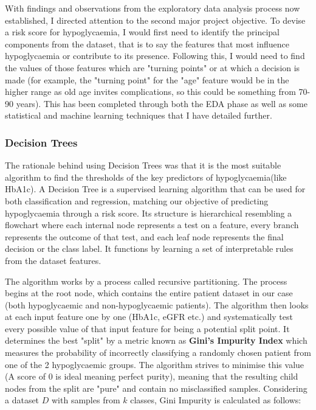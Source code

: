 	\noindent With findings and observations from the exploratory data analysis process now established, I directed attention to the second major project objective.  To devise a risk score for hypoglycaemia, I would first need to identify the principal components from the dataset, that is to say the features that most influence hypoglycaemia or contribute to its presence. Following this, I would need to find the values of those features which are "turning points" or at which a decision is made (for example, the "turning point" for the "age" feature would be in the higher range as old age invites complications, so this could be something from 70-90 years). This has been completed through both the EDA phase as well as some statistical and machine learning techniques that I have detailed further.

	\subsubsection{Decision Trees}
	The rationale behind using Decision Trees was that it is the most suitable algorithm to find the thresholds of the key predictors of hypoglycaemia(like HbA1c). A Decision Tree is a supervised learning algorithm that can be used for both classification and regression, matching our objective of predicting hypoglycaemia through a risk score. Its structure is hierarchical resembling a flowchart where each internal node represents a test on a feature, every branch represents the outcome of that test, and each leaf node represents the final decision or the class label. It functions by learning a set of interpretable rules from the dataset features. 

	\vspace{5pt}
	\noindent The algorithm works by a process called recursive partitioning. The process begins at the root node, which contains the entire patient dataset in our case (both hypoglycaemic and non-hypoglycaemic patients). The algorithm then looks at each input feature one by one (HbA1c, eGFR etc.) and systematically test every possible value of that input feature for being a potential split point. It determines the best "split" by a metric known as \textbf{Gini's Impurity Index} which measures the probability of incorrectly classifying a randomly chosen patient from one of the 2 hypoglycaemic groups. The algorithm strives to minimise this value (A score of 0 is ideal meaning perfect purity), meaning that the resulting child nodes from the split are "pure" and contain no misclassified samples. Considering a dataset $D$ with samples from $k$ classes, Gini Impurity is calculated as follows: 
	
